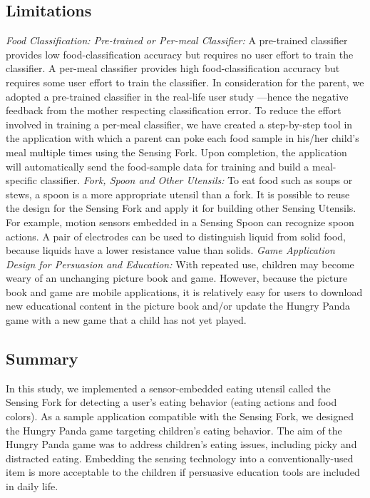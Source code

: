 \subsection{Limitations}
\textit{Food Classification: Pre-trained or Per-meal Classifier:}
A pre-trained classifier provides low food-classification accuracy 
but requires no user effort to train the classifier. 
A per-meal classifier provides high food-classification accuracy 
but requires some user effort to train the classifier. 
In consideration for the parent, we adopted a pre-trained classifier 
in the real-life user study ---hence the negative feedback 
from the mother respecting classification error. 
To reduce the effort involved in training a per-meal classifier, 
we have created a step-by-step tool in the application 
with which a parent can poke each food sample in his/her child's meal multiple times 
using the Sensing Fork. 
Upon completion, the application will automatically send the food-sample data 
for training and build a meal-specific classifier. 
\vspace{10pt}
\newline
\textit{Fork, Spoon and Other Utensils:}
\newline
To eat food such as soups or stews, a spoon is a more appropriate utensil than a fork. 
It is possible to reuse the design for the Sensing Fork and apply it 
for building other Sensing Utensils. 
For example, motion sensors embedded in a Sensing Spoon can recognize spoon actions. 
A pair of electrodes can be used to distinguish liquid from solid food, 
because liquids have a lower resistance value than solids. 
\vspace{10pt}
\newline
\textit{Game Application Design for Persuasion and Education:}
\newline
With repeated use, children may become weary of an unchanging picture book and game. 
However, because the picture book and game are mobile applications, 
it is relatively easy for users to download new educational content 
in the picture book and/or update the Hungry Panda game 
with a new game that a child has not yet played. 

\subsection{Summary}
In this study, we implemented a sensor-embedded eating utensil called the Sensing Fork 
for detecting a user's eating behavior (eating actions and food colors). 
As a sample application compatible with the Sensing Fork, 
we designed the Hungry Panda game targeting children's eating behavior. 
The aim of the Hungry Panda game was to address children's eating issues, including picky and distracted eating. 
Embedding the sensing technology into a conventionally-used item 
is more acceptable to the children if persuasive education tools are included in daily life.
\newpage









